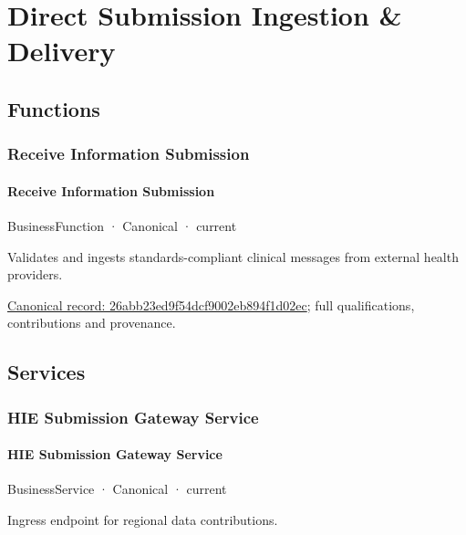 \section{Direct Submission Ingestion \& Delivery}

\subsection{Functions}

\subsubsection{Receive Information Submission}

\paragraph{Receive Information Submission}

\label{element:26abb23ed9f54dcf9002eb894f1d02ec}
{\small BusinessFunction · Canonical · current}\par

Validates and ingests standards-compliant clinical messages from external health providers.


{\footnotesize \href{../../../../continuum/business/business-function/26abb23ed9f54dcf9002eb894f1d02ec.md}{Canonical record: 26abb23ed9f54dcf9002eb894f1d02ec}; full qualifications, contributions and provenance.}\par
\subsection{Services}

\subsubsection{HIE Submission Gateway Service}

\paragraph{HIE Submission Gateway Service}

\label{element:816c1013b609440fb772060396fd2dac}
{\small BusinessService · Canonical · current}\par

Ingress endpoint for regional data contributions.



